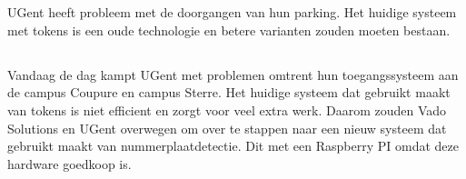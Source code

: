
\chapter{}
\label{ch:inleiding}



UGent heeft probleem met de doorgangen van hun parking. Het huidige systeem met tokens is een oude technologie en betere varianten zouden moeten bestaan.

\section{}
\label{sec:probleemstelling}

Vandaag de dag kampt UGent met problemen omtrent hun toegangssysteem aan de campus Coupure en campus Sterre. Het huidige systeem dat gebruikt maakt van tokens is niet efficient en zorgt voor veel extra werk. Daarom zouden Vado Solutions en UGent overwegen om over te stappen naar een nieuw systeem dat gebruikt maakt van nummerplaatdetectie. Dit met een Raspberry PI omdat deze hardware goedkoop is.

